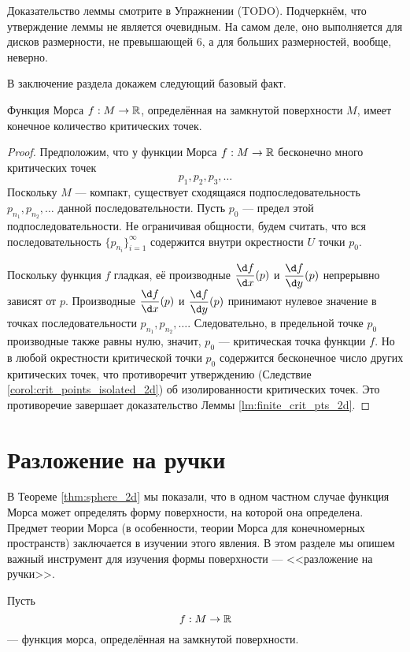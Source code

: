 \documentclass[a4paper,12pt,openany,leqno]{extbook}
\begin{document}
Доказательство леммы смотрите в Упражнении (TODO). Подчеркнём, что утверждение леммы не является очевидным. На самом деле, оно выполняется для дисков размерности, не превышающей $6$, а для больших размерностей, вообще, неверно.

В заключение раздела докажем следующий базовый факт.

\begin{lemma}
Функция Морса $f:M \to \mathbb{R}$, определённая на замкнутой поверхности $M$, имеет конечное количество критических точек.
\label{lm:finite_crit_pts_2d}
\end{lemma}

\begin{proof}
Предположим, что у функции Морса $f: M \to \mathbb{R}$ бесконечно много критических точек
\[p_1, p_2, p_3, \ldots\]
Поскольку $M$ --- компакт, существует сходящаяся подпоследовательность $p_{n_1}, p_{n_2}, \ldots$ данной последовательности. Пусть $p_0$ --- предел этой подпоследовательности. Не ограничивая общности, будем считать, что вся последовательность $\{p_{n_i}\}_{i = 1}^{\infty}$ содержится внутри окрестности $U$ точки $p_0$.

Поскольку функция $f$ гладкая, её производные $\dfrac{\d f}{\d x}(p)$ и $\dfrac{\d f}{\d y}(p)$ непрерывно зависят от $p$. Производные $\dfrac{\d f}{\d x}(p)$ и $\dfrac{\d f}{\d y}(p)$ принимают нулевое значение в точках последовательности $p_{n_1}, p_{n_2}, \ldots$. Следовательно, в предельной точке $p_0$ производные также равны нулю, значит, $p_0$ --- критическая точка функции $f$. Но в любой окрестности критической точки $p_0$ содержится бесконечное число других критических точек, что противоречит утверждению (Следствие \ref{corol:crit_points_isolated_2d}) об изолированности критических точек. Это противоречие завершает доказательство Леммы \ref{lm:finite_crit_pts_2d}.
\end{proof}

\section{Разложение на ручки}

В Теореме \ref{thm:sphere_2d} мы показали, что в одном частном случае функция Морса может определять форму поверхности, на которой она определена. Предмет теории Морса (в особенности, теории Морса для конечномерных пространств) заключается в изучении этого явления. В этом разделе мы опишем важный инструмент для изучения формы поверхности --- <<разложение на ручки>>.

Пусть
\[f:M\to\mathbb{R}\]
--- функция морса, определённая на замкнутой поверхности.
\end{document}
